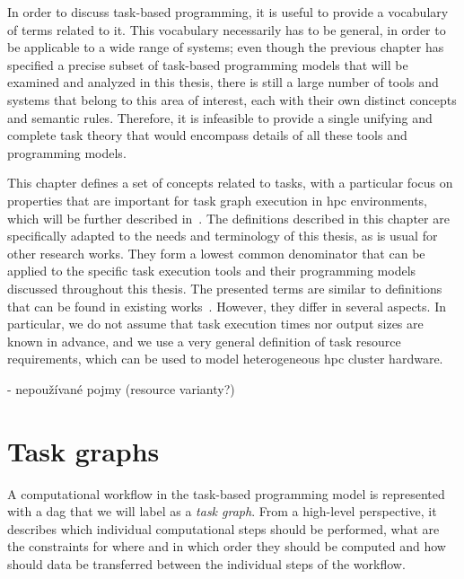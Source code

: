 In order to discuss task-based programming, it is useful to provide a vocabulary of terms related
to it. This vocabulary necessarily has to be general, in order to be applicable to a wide range of
systems; even though the previous chapter has specified a precise subset of task-based programming
models that will be examined and analyzed in this thesis, there is still a large number of tools
and systems that belong to this area of interest, each with their own distinct concepts and
semantic rules. Therefore, it is infeasible to provide a single unifying and complete task theory
that would encompass details of all these tools and programming models.

This chapter defines a set of concepts related to tasks, with a particular focus on properties that
are important for task graph execution in \gls{hpc} environments, which will be
further described in~. The definitions described in this chapter are
specifically adapted to the needs and terminology of this thesis, as is usual for other research
works. They form a lowest common denominator that can be applied to the specific task execution
tools and their programming models discussed throughout this thesis. The presented terms are
similar to definitions that can be found in existing works~\cite{task_scheduling,hagras2003static,wang2018list}. However, they
differ in several aspects. In particular, we do not assume that task execution times nor output
sizes are known in advance, and we use a very general definition of task resource requirements,
which can be used to model heterogeneous \gls{hpc} cluster hardware.

- nepoužívané pojmy (resource varianty?)

\section{Task graphs}
A computational workflow in the task-based programming model is represented with a
\gls{dag} that we will label as a \emph{task graph}. From a high-level
perspective, it describes which individual computational steps should be performed, what are the
constraints for where and in which order they should be computed and how should data be transferred
between the individual steps of the workflow.

